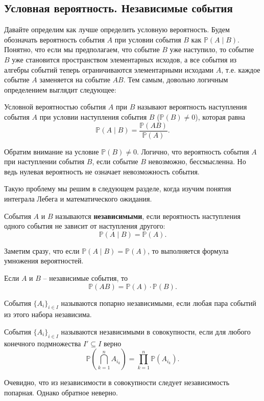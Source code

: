 \subsection{Условная вероятность. Независимые события}
Давайте определим как лучше определить условную вероятность. Будем обозначать вероятность события $A$ при условии события $B$ как $\mathbb{P}(A \mid B)$. Понятно, что если мы предполагаем, что событие $B$ уже наступило, то событие $B$ уже становится пространством элементарных исходов, а все события из алгебры событий теперь ограничиваются элементарными исходами $A$, т.е. каждое событие $A$ заменяется на событие $AB$. Тем самым, довольно логичным определением выглядит следующее:

\begin{definition}
Условной вероятностью события $A$ при $B$ называют вероятность наступления события $A$ при условии наступления события $B$ ($\mathbb{P}(B) \neq 0$), которая равна
\[
\mathbb{P}(A \mid B) = \frac{\mathbb{P}(AB)}{\mathbb{P}(A)}.
\]
\end{definition}

Обратим внимание на условие $\mathbb{P}(B) \neq 0$. Логично, что вероятность события $A$ при наступлении события $B$, если событие $B$ невозможно, бессмысленна. Но ведь нулевая вероятность не означает невозможность события.

Такую проблему мы решим в следующем разделе, когда изучим понятия интеграла Лебега и математического ожидания.

\begin{definition}
События $A$ и $B$ называются \textbf{независимыми}, если вероятность наступления одного события не зависит от наступления другого:
\[
\mathbb{P}(A \mid B) = \mathbb{P}(A).
\]
\end{definition}

Заметим сразу, что если $\mathbb{P}(A \mid B) = \mathbb{P}(A)$, то выполняется формула умножения вероятностей.

\begin{theorem}
Если $A$ и $B$ -- независимые события, то
\[
\mathbb{P}(AB) = \mathbb{P}(A) \cdot \mathbb{P}(B).
\]
\end{theorem}

\begin{definition}
События $\{A_i\}_{i \in I}$ называются попарно независимыми, если любая пара событий из этого набора независима.
\end{definition}

\begin{definition}
События $\{A_i\}_{i \in I}$ называются независимыми в совокупности, если для любого конечного подмножества $I' \subseteq I$ верно
\[
\mathbb{P}\!\left(\bigcap_{k=1}^{n} A_{i_k}\right) = \prod_{k=1}^{n} \mathbb{P}(A_{i_k}).
\]
\end{definition}

\begin{notice}
Очевидно, что из независимости в совокупности следует независимость попарная. Однако обратное неверно.
\end{notice}